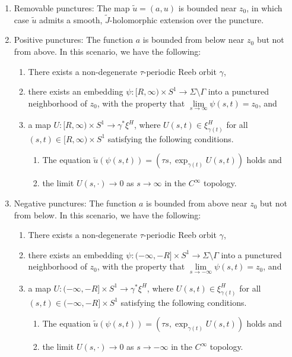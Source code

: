 \documentclass[11pt, a4paper]{amsart}
\begin{document}
\begin{enumerate}
\itemsep0.4em
\item Removable punctures: The map $\tilde{u} = (a, u)$ is bounded near $z_0$, in which case $\tilde{u}$ admits a smooth, $\tilde{J}$-holomorphic extension over the puncture.
    
\item Positive punctures: The function $a$ is bounded from below near $z_0$ but not from above. In this scenario, we have the following:
\vspace{0.4em}
\begin{enumerate}
    \itemsep0.4em
    \item There exists a non-degenerate $\tau$-periodic Reeb orbit $\gamma$,
    \item there exists an embedding $\psi\colon [R, \infty) \times S^1 \rightarrow \Sigma \setminus \Gamma$ into a punctured neighborhood of $z_0$, with the property that $\lim\limits_{s\rightarrow \infty} \psi(s, t) = z_0$, and
    \item a map $U\colon [R, \infty) \times S^1 \rightarrow \gamma^* \xi^H$, where $U(s, t) \in \xi_{\gamma(t)}^H$ for all $(s, t) \in [R, \infty) \times S^1$ satisfying the following conditions.
    \vspace{0.4em}
    \begin{enumerate}
    \itemsep0.4em
        \item The equation $\tilde{u}(\psi(s, t)) = (\tau s, \exp_{\gamma(t)} U(s, t))$ holds and
        \item the limit $U(s, \cdot) \rightarrow 0$ as $s\rightarrow \infty$ in the $C^\infty$ topology.
    \end{enumerate}
\end{enumerate}


\item  Negative punctures: The function $a$ is bounded from above near $z_0$ but not from below. In this scenario, we have the following:
\vspace{0.4em}
\begin{enumerate}
    \itemsep0.4em
    \item There exists a non-degenerate $\tau$-periodic Reeb orbit $\gamma$,
    \item there exists an embedding $\psi\colon (-\infty,-R] \times S^1 \rightarrow \Sigma \setminus \Gamma$ into a punctured neighborhood of $z_0$, with the property that $\lim\limits_{s\rightarrow -\infty} \psi(s, t) = z_0$, and
    \item a map $U\colon (-\infty,-R] \times S^1 \rightarrow \gamma^* \xi^H$, where $U(s, t) \in \xi_{\gamma(t)}^H$ for all $(s, t) \in (-\infty,-R] \times S^1$ satisfying the following conditions.
    \vspace{0.4em}
    \begin{enumerate}
    \itemsep0.4em
        \item The equation $\tilde{u}(\psi(s, t)) = (\tau s, \exp_{\gamma(t)} U(s, t))$ holds and
        \item the limit $U(s, \cdot) \rightarrow 0$ as $s\rightarrow -\infty$ in the $C^\infty$ topology.
    \end{enumerate}
\end{enumerate}
\end{enumerate}
\end{document}
